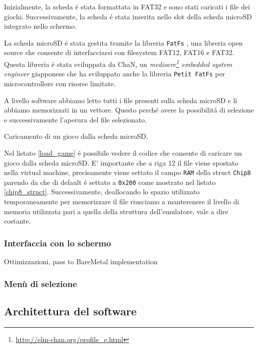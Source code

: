 \documentclass[a4paper]{article}
\begin{document}
Inizialmente, la scheda é stata formattata in FAT32 e sono stati caricati i file dei giochi. Successivamente, la scheda é stata inserita nello slot della scheda microSD integrato nello schermo.

La scheda microSD é stata gestita tramite la libreria \texttt{FatFs} \cite{elm-chan:fatfs}, una libreria open source che consente di interfacciarsi con filesystem FAT12, FAT16 e FAT32. Questa libreria é stata sviluppata da ChaN, un \textit{mediocre\footnote{\url{http://elm-chan.org/profile_e.html}} embedded system engineer} giapponese che ha sviluppato anche la libreria \texttt{Petit FatFs} per microcontrollore con risorse limitate.

A livello software abbiamo letto tutti i file presenti sulla scheda microSD e li abbiamo memorizzati in un vettore. Questo perché avere la possibilitá di selezione e successivamente l'aperura del file selezionato.

\begin{Listing}[h!t] %
    \centering
    \caption{Caricamento di un gioco dalla scheda microSD.}
    \label{load_game}
\end{Listing}

Nel listato \ref{load_game} é possibile vedere il codice che consente di caricare un gioco dalla scheda microSD. E' importante che a riga 12 il file viene spostato nella virtual machine, precisamente viene settato il campo \texttt{RAM} della struct \texttt{Chip8} parendo da  che di default é settato a \texttt{0x200} come mostrato nel listato \ref{chip8_struct}. Successivamente, deallocando lo spazio utilizzato temporaneamente per memorizzare il file riusciamo a manterenere
il livello di memoria utilizzata pari a quella della struttura dell'emulatore, vale a dire costante.

\subsubsection{Interfaccia con lo schermo}

Ottimizzazioni, pass to BareMetal implementation

\subsubsection{Menù di selezione}

\subsection{Architettura del software}
\end{document}
